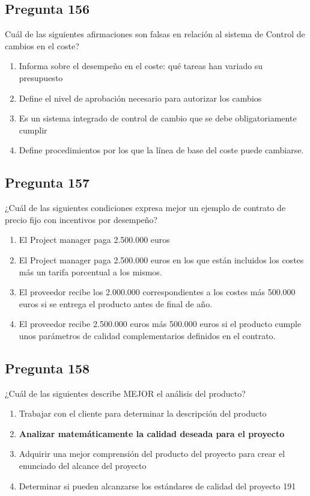 \documentclass[11pt,a4paper]{article}
\begin{document}
\subsection*{Pregunta 156}
Cuál de las siguientes afirmaciones son falsas en relación al sistema de Control de cambios en el coste?

\begin{enumerate}[label=\alph*)]
  \item Informa sobre el desempeño en el coste: qué tareas han variado su presupuesto
  \item Define el nivel de aprobación necesario para autorizar los cambios
  \item Es un sistema integrado de control de cambio que se debe obligatoriamente cumplir
  \item Define procedimientos por los que la línea de base del coste puede cambiarse.
\end{enumerate}

\subsection*{Pregunta 157}
¿Cuál de las siguientes condiciones expresa mejor un ejemplo de contrato de precio fijo con incentivos por desempeño?

\begin{enumerate}[label=\alph*)]
  \item El Project manager paga 2.500.000 euros
  \item El Project manager paga 2.500.000 euros en los que están incluidos los costes más un tarifa porcentual a los mismos.
  \item El proveedor recibe los 2.000.000 correspondientes a los costes más 500.000 euros si se entrega el producto antes de final de año.
  \item El proveedor recibe 2.500.000 euros más 500.000 euros si el producto cumple unos parámetros de calidad complementarios definidos en el contrato.
\end{enumerate}

\subsection*{Pregunta 158}
¿Cuál de las siguientes describe MEJOR el análisis del producto?

\begin{enumerate}[label=\alph*)]
  \item Trabajar con el cliente para determinar la descripción del producto
  \item \textbf{Analizar matemáticamente la calidad deseada para el proyecto}
  \item Adquirir una mejor comprensión del producto del proyecto para crear el enunciado del alcance del proyecto
  \item Determinar si pueden alcanzarse los estándares de calidad del proyecto 191
\end{enumerate}
\end{document}
